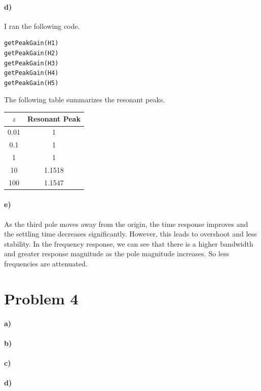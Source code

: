 \documentclass[12pt]{article}
\begin{document}
\paragraph{d)}

I ran the following code.
\begin{verbatim}
getPeakGain(H1)
getPeakGain(H2)
getPeakGain(H3)
getPeakGain(H4)
getPeakGain(H5)
\end{verbatim}
The following table summarizes the resonant peaks.
\begin{center}
    \begin{tabular}{c|c}
        \(z\) & Resonant Peak\\
        \hline
        0.01 & 1\\
        0.1 & 1\\
        1 & 1\\
        10 & 1.1518\\
        100 & 1.1547
    \end{tabular}
\end{center}

\paragraph{e)}

As the third pole moves away from the origin, the time response improves and the settling time decreases significantly.
However, this leads to overshoot and less stability. In the frequency response, we can see that there is a higher
bandwidth and greater response magnitude as the pole magnitude increases. So less frequencies are attenuated.

\section*{Problem 4}

\paragraph{a)}

\paragraph{b)}

\paragraph{c)}

\paragraph{d)}
\end{document}
